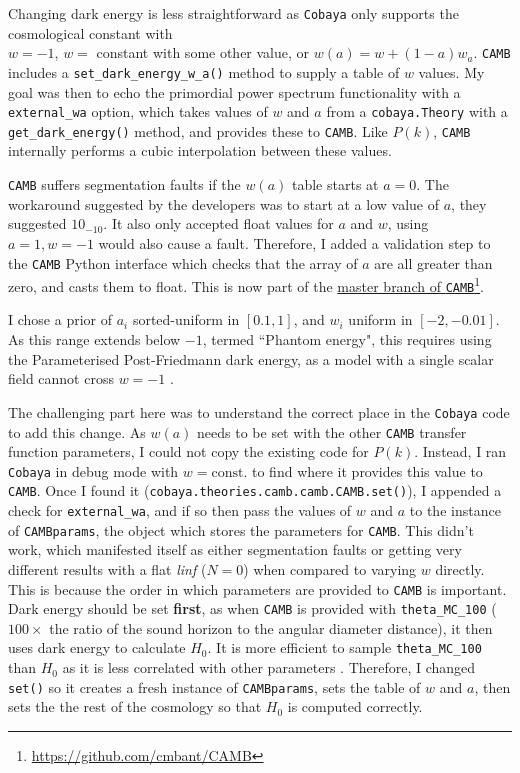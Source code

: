 \documentclass{article}
\begin{document}
Changing dark energy is less straightforward as \texttt{Cobaya} only supports the cosmological constant with \\ $w=-1$, $w =$ constant with some other value, or $w(a) = w+(1-a)w_a$. \texttt{CAMB} includes a \texttt{set\_dark\_energy\_w\_a()} method to supply a table of $w$ values. My goal was then to echo the primordial power spectrum functionality with a \texttt{external\_wa} option, which takes values of $w$ and $a$ from a \texttt{cobaya.Theory} with a \texttt{get\_dark\_energy()} method, and provides these to \texttt{CAMB}. Like $P(k)$, \texttt{CAMB} internally performs a cubic interpolation between these values.

\texttt{CAMB} suffers segmentation faults if the $w(a)$ table starts at $a=0$. The workaround suggested by the developers was to start at a low value of $a$, they suggested $10_{-10}$. It also only accepted float values for $a$ and $w$, using $a=1, w=-1$ would also cause a fault. Therefore, I added a validation step to the \texttt{CAMB} Python interface which checks that the array of $a$ are all greater than zero, and casts them to float. This is now part of the \href{https://github.com/cmbant/CAMB}{master branch of \texttt{CAMB}}\footnote{\href{https://github.com/cmbant/CAMB}{https://github.com/cmbant/CAMB}}.

I chose a prior of $a_i$ sorted-uniform in $[0.1, 1]$, and $w_i$ uniform in $[-2, -0.01]$. As this range extends below $-1$, termed ``Phantom energy", this requires using the Parameterised Post-Friedmann dark energy, as a model with a single scalar field cannot cross $w=-1$ \cite{PPF}. 

The challenging part here was to understand the correct place in the \texttt{Cobaya} code to add this change. As $w(a)$ needs to be set with the other \texttt{CAMB} transfer function parameters, I could not copy the existing code for $P(k)$. Instead, I ran \texttt{Cobaya} in debug mode with $w=\textrm{const.}$ to find where it provides this value to \texttt{CAMB}. Once I found it (\texttt{cobaya.theories.camb.camb.CAMB.set()}), I appended a check for \texttt{external\_wa}, and if so then pass the values of $w$ and $a$ to the instance of \texttt{CAMBparams}, the object which stores the parameters for \texttt{CAMB}. This didn't work, which manifested itself as either segmentation faults or getting very different results with a flat \textit{linf} ($N=0$) when compared to varying $w$ directly. This is because the order in which parameters are provided to \texttt{CAMB} is important. Dark energy should be set \textbf{first}, as when \texttt{CAMB} is provided with \texttt{theta\_MC\_100} ($100 \times$ the ratio of the sound horizon to the angular diameter distance), it then uses dark energy to calculate $H_0$. It is more efficient to sample \texttt{theta\_MC\_100} than $H_0$ as it is less correlated with other parameters \cite{CosmoMCReadMe}. Therefore, I changed \texttt{set()} so it creates a fresh instance of \texttt{CAMBparams}, sets the table of $w$ and $a$, then sets the the rest of the cosmology so that $H_0$ is computed correctly.
\end{document}
